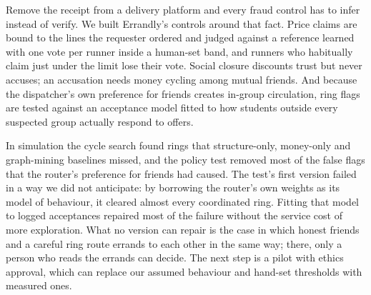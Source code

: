 Remove the receipt from a delivery platform and every fraud control has to infer
instead of verify. We built Errandly's controls around that fact. Price claims are
bound to the lines the requester ordered and judged against a reference learned with
one vote per runner inside a human-set band, and runners who habitually claim just
under the limit lose their vote. Social closure discounts trust but never accuses; an
accusation needs money cycling among mutual friends. And because the dispatcher's own
preference for friends creates in-group circulation, ring flags are tested against an
acceptance model fitted to how students outside every suspected group actually
respond to offers.

In simulation the cycle search found rings that structure-only, money-only and
graph-mining baselines missed, and the policy test removed most of the false flags
that the router's preference for friends had caused. The test's first version failed
in a way we did not anticipate: by borrowing the router's own weights as its model of
behaviour, it cleared almost every coordinated ring. Fitting that model to logged
acceptances repaired most of the failure without the service cost of more
exploration. What no version can repair is the case in which honest friends and a
careful ring route errands to each other in the same way; there, only a person who
reads the errands can decide. The next step is a pilot with ethics approval, which
can replace our assumed behaviour and hand-set thresholds with measured ones.
